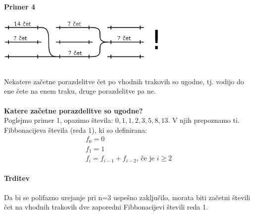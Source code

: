 \documentclass[a4paper,10pt]{article}
\begin{document}
\paragraph{Primer 4}
	\begin{center}
	\includegraphics[width=8.45cm,height=2.5cm]{Slike/PolifaznoZlivanjePrimer4.png}
	\end{center}
Nekatere za\v cetne porazdelitve \v cet po vhodnih trakovih so ugodne, tj. vodijo do ene \v cete na enem traku, druge porazdelitve pa ne.\\
\\
\textbf{Katere za\v cetne porazdelitve so ugodne?}\\
Poglejmo primer 1, opazimo \v stevila: $0, 1, 1, 2, 3, 5, 8, 13$. V njih prepoznamo ti. Fibbonacijeva \v stevila (reda 1), ki so definirana:
$$
\begin{array}{l}
f_0 = 0\\
f_1 = 1\\
f_i = f_{i-1} + f_{i-2}\mbox{, \v ce je } i\geq 2
\end{array}
$$

\paragraph{Trditev}
Da bi se polifazno urejanje pri n=3 uspe\v sno zaklju\v cilo, morata biti za\v cetni \v stevili \v cet na vhodnih trakovih dve zaporedni Fibbonacijevi \v stevili reda 1.
\end{document}
